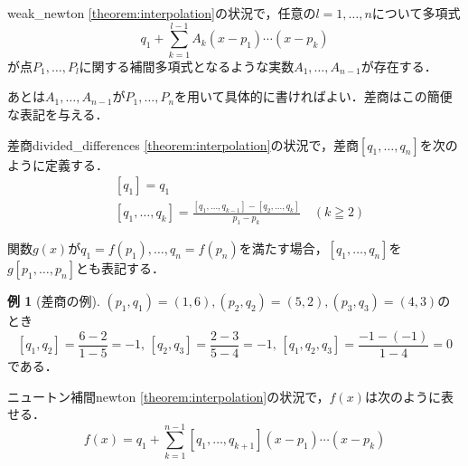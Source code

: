 \documentclass[a4paper]{ltjsarticle}
\theoremstyle{definition}
\newtheorem{example}{例}[section]
\begin{document}
\begin{theorem}{}{weak_newton}
  \cref{theorem:interpolation}の状況で，任意の$l=1,\dots,n$について多項式
  \[
    q_1 + \sum_{k=1}^{l-1} A_k(x-p_1)\cdots (x-p_k)
  \]
  が点$P_1,\dots,P_l$に関する補間多項式となるような実数$A_1,\dots,A_{n-1}$が存在する．
\end{theorem}

あとは$A_1,\dots,A_{n-1}$が$P_1,\dots,P_n$を用いて具体的に書ければよい．差商はこの簡便な表記を与える．

\begin{definition}{差商}{divided_differences}
  \cref{theorem:interpolation}の状況で，差商$[q_1, \dots, q_n]$を次のように定義する．
  \begin{align*}
    &[q_1] = q_1\\
    &[q_1,\dots,q_k] = \frac{[q_1,\dots,q_{k-1}]-[q_2,\dots,q_k]}{p_1-p_k} \quad (k \geqq 2)
  \end{align*}

  関数$g(x)$が$q_1=f(p_1),\dots,q_n=f(p_n)$を満たす場合，$[q_1,\dots,q_n]$を$g[p_1,\dots,p_n]$とも表記する．
\end{definition}

\begin{example}[差商の例]
  \label{example:divided_differences}
  $(p_1,q_1)=(1,6),(p_2,q_2)=(5,2),(p_3,q_3)=(4,3)$のとき
  \[
    [q_1, q_2] = \frac{6-2}{1-5} = -1,\,
    [q_2, q_3] = \frac{2-3}{5-4} = -1,\,
    [q_1,q_2,q_3] = \frac{-1-(-1)}{1-4} = 0
  \]
  である．
\end{example}

\begin{theorem}{ニュートン補間}{newton}
  \cref{theorem:interpolation}の状況で，$f(x)$は次のように表せる．
  \[
    f(x) = q_1 + \sum_{k=1}^{n-1} [q_1,\dots,q_{k+1}] (x-p_1) \cdots (x-p_k)
  \]
\end{theorem}
\end{document}
